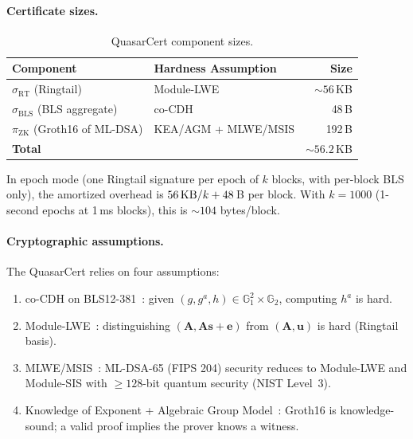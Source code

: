 \paragraph{Certificate sizes.}

\begin{table}[ht]
\centering
\begin{tabular}{@{}llr@{}}
\toprule
\textbf{Component} & \textbf{Hardness Assumption} & \textbf{Size} \\
\midrule
$\sigma_{\mathrm{RT}}$ (Ringtail) & Module-LWE & ${\sim}56$\,KB \\
$\sigma_{\mathrm{BLS}}$ (BLS aggregate) & co-CDH & 48\,B \\
$\pi_{\mathrm{ZK}}$ (Groth16 of ML-DSA) & KEA/AGM + MLWE/MSIS & 192\,B \\
\midrule
\textbf{Total} & & ${\sim}56.2$\,KB \\
\bottomrule
\end{tabular}
\caption{QuasarCert component sizes.}
\label{tab:cert-sizes}
\end{table}

\begin{remark}
In epoch mode (one Ringtail signature per epoch of $k$ blocks, with
per-block BLS only), the amortized overhead is $56\text{\,KB}/k + 48$\,B
per block.  With $k = 1000$ (1-second epochs at 1\,ms blocks), this is
${\sim}104$ bytes/block.
\end{remark}

\paragraph{Cryptographic assumptions.}
The QuasarCert relies on four assumptions:
\begin{enumerate}[nosep]
  \item co-CDH on BLS12-381~\cite{boneh2001short}: given
    $(g, g^a, h) \in \mathbb{G}_1^2 \times \mathbb{G}_2$, computing
    $h^a$ is hard.
  \item Module-LWE~\cite{regev2005}: distinguishing
    $(\mathbf{A}, \mathbf{As}+\mathbf{e})$ from
    $(\mathbf{A}, \mathbf{u})$ is hard (Ringtail basis).
  \item MLWE/MSIS~\cite{nist-pqc}: ML-DSA-65 (FIPS 204) security
    reduces to Module-LWE and Module-SIS with ${\geq}128$-bit quantum
    security (NIST Level~3).
  \item Knowledge of Exponent + Algebraic Group
    Model~\cite{groth2016}: Groth16 is knowledge-sound; a valid proof
    implies the prover knows a witness.
\end{enumerate}


